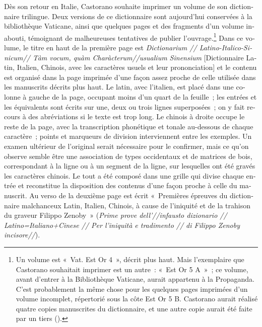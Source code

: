 \documentclass[output=paper,colorlinks,citecolor=brown,arabicfont,chinesefont,booklanguage=french]{langscibook}
\begin{document}
\begin{otherlanguage}{french}
Dès son retour en Italie, Castorano souhaite imprimer un volume de son dictionnaire trilingue. Deux versions de ce dictionnaire sont aujourd’hui conservées à la bibliothèque Vaticane, ainsi que quelques pages et des fragments d’un volume inabouti, témoignant de malheureuses tentatives de publier l’ouvrage.\footnote{Un volume est «~Vat. Est Or 4~», décrit plus haut. Mais l’exemplaire que Castorano souhaitait imprimer est un autre~: «~Est Or 5 A~»~; ce volume, avant d’entrer à la Bibliothèque Vaticane, aurait appartenu à la Propaganda. C’est probablement la même chose pour les quelques pages imprimées d’un volume incomplet, répertorié sous la côte Est Or 5 B.  Castorano aurait réalisé quatre copies manuscrites du dictionnaire, et une autre copie aurait été faite par un tiers (\citealt[95]{Civezza1879}).} Dans ce volume, le titre en haut de la première page est \emph{Dictionarium // Latino-Italico-Sinicum// Tàm vocum, quàm Charàcterum//usualium Sinensium} [Dictionnaire Latin, Italien, Chinois, avec les caractères usuels et leur prononciation] et le contenu est organisé dans la page imprimée d’une façon assez proche de celle utilisée dans les manuscrits décrits plus haut. Le latin, avec l’italien, est placé dans une colonne à gauche de la page, occupant moins d’un quart de la feuille~; les entrées et les équivalents sont écrits sur une, deux ou trois lignes superposées~; on y fait recours à des abréviations si le texte est trop long. Le chinois à droite occupe le reste de la page, avec la transcription phonétique et tonale au-dessous de chaque caractère~; points et marqueurs de division interviennent entre les exemples. Un examen ultérieur de l’original serait nécessaire pour le confirmer, mais ce qu’on observe semble être une association de types occidentaux et de matrices de bois, correspondant à la ligne ou à un segment de la ligne, sur lesquelles ont été gravés les caractères chinois. Le tout a été composé dans une grille qui divise chaque entrée et reconstitue la disposition des contenus d’une façon proche à celle du manuscrit. Au verso de la deuxième page est écrit «~Premières épreuves du dictionnaire malchanceux Latin, Italien, Chinois, à cause de l’iniquité et de la trahison du graveur Filippo Zenoby~» (\emph{Prime prove dell'//infausto dizionario // Latino=Italiano+Cinese // Per l’iniquità e tradimento // di Filippo Zenoby incisore//}).


\end{otherlanguage}
\end{document}
